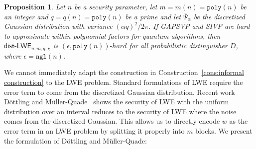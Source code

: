 \documentclass[11pt]{article}
\newcommand{\consref}[1]{\mbox{Construction~\ref{#1}}}
\newcommand{\class}[1]{{\ensuremath{\mathsf{#1}}}}
\newcommand{\rep}{\ensuremath{\class{Rep}}\xspace}
\newcommand{\vect}[1]{\ensuremath{\textbf{#1}}}
\newcommand{\unp}{\ensuremath{\mathtt{unp}}\xspace}
\newcommand{\poly}{\ensuremath{\mathtt{poly}}\xspace}
\newcommand{\ngl}{\ensuremath{\mathtt{ngl}}\xspace}
\newcommand{\distLWE}{\ensuremath{\class{dist\mbox{-}LWE}}}
\newtheorem{lemma}[theorem]{Lemma}
\newtheorem{proposition}[theorem]{Proposition}
\newcommand{\vA}{\vect{A}}
\begin{document}
\begin{proposition} 
\label{assume:entropy LWE}
Let $n$ be a security parameter, let $m = m(n) = \poly(n)$ be an integer and $q = q(n) = \poly(n)$ be a prime and let $\bar{\Psi}_\alpha$ be the discretized Gaussian distribution with variance $(\alpha q)^2/2\pi$.  If GAPSVP and SIVP are hard to approximate within polynomial factors for quantum algorithms, then $\distLWE_{n, m, q, \chi}$ is $(\epsilon, \poly(n))\mbox{-}hard$ for all probabilistic distinguisher $D$, where $\epsilon = \ngl(n)$.

\end{proposition}

We cannot immediately adapt the construction in \consref{cons:informal construction} to the LWE problem.  Standard formulations of LWE require the error term to come from the discretized Gaussian distribution.  
Recent work D\"{o}ttling and M\"{u}ller-Quade~\cite{dottling2012} shows the security of LWE with the uniform distribution over an interval reduces to the security of LWE where the noise comes from the discretized Gaussian.  This allows us to directly encode $w$ as the error term in an LWE problem by splitting it properly into $m$ blocks.
We present the formulation of D\"{o}ttling and M\"{u}ller-Quade: 
\end{document}
